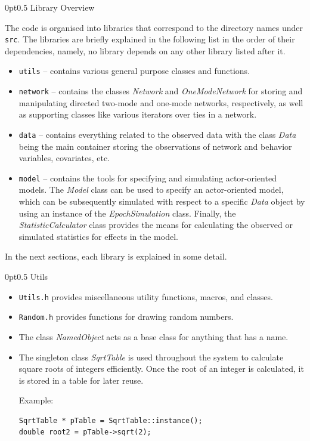 \documentclass[12pt]{article}
\makeatletter
\renewcommand{\=}{\,=\,}
\newcommand{\+}{\,+\,}
\newcommand{\nnm}[1]{\textsf{\small\textit{#1}}}
\renewcommand{\section}{\@startsection{section}{1}
                {0pt}{\baselineskip}{0.5\baselineskip}
                {\centering\sffamily} }
\makeatother
\begin{document}
\section{Library Overview}

The code is organised into libraries that correspond to the directory names
under \texttt{src}. The libraries are briefly explained in the following list
in the order of their dependencies, namely, no library depends on any other
library listed after it.
\begin{itemize}
\item \texttt{utils} -- contains various general purpose classes and functions.
\item \texttt{network} -- contains the classes \nnm{Network} and
\nnm{OneModeNetwork} for storing and manipulating directed two-mode and one-mode
networks, respectively, as well as supporting classes like various iterators
over ties in a network.
\item \texttt{data} -- contains everything related to the observed data
with the class \nnm{Data} being the main container storing the observations of
network and behavior variables, covariates, etc.
\item \texttt{model} -- contains the tools for specifying and simulating
actor-oriented models. The \nnm{Model} class can be used to specify an
actor-oriented model, which can be subsequently simulated with respect to a
specific \nnm{Data} object by using an instance of the \nnm{EpochSimulation}
class. Finally, the \nnm{StatisticCalculator} class provides the means for
calculating the observed or simulated statistics for effects in the model.
\end{itemize}

In the next sections, each library is explained in some detail.

\section{Utils}

\begin{itemize}
\item \texttt{Utils.h} provides miscellaneous utility functions, macros, and
classes.
\item \texttt{Random.h} provides functions for drawing random numbers.
\item The class \nnm{NamedObject} acts as a base class for anything that has
a name.
\item The singleton class \nnm{SqrtTable} is used throughout the system to
calculate square roots of integers efficiently. Once the root of an integer is
calculated, it is stored in a table for later reuse.

Example:
\begin{verbatim}
SqrtTable * pTable = SqrtTable::instance();
double root2 = pTable->sqrt(2);
\end{verbatim}
\end{itemize}
\end{document}
